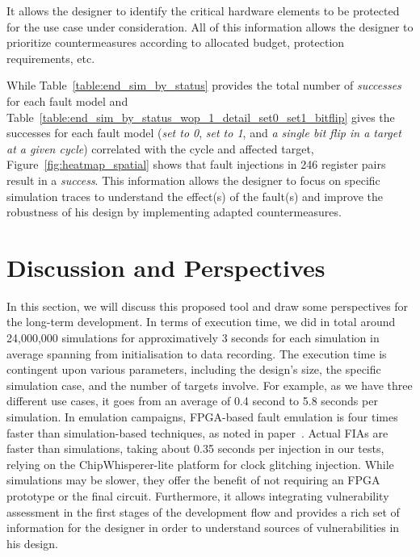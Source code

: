 It allows the designer to identify the critical hardware elements to be protected for the use case under consideration.
All of this information allows the designer to prioritize countermeasures according to allocated budget, protection requirements, etc.

While Table~\ref{table:end_sim_by_status} provides the total number of \textit{successes} for each fault model and Table~\ref{table:end_sim_by_status_wop_1_detail_set0_set1_bitflip} gives the successes for each fault model (\textit{set to 0}, \textit{set to 1}, and \textit{a single bit flip in a target at a given cycle}) correlated with the cycle and affected target, Figure~\ref{fig:heatmap_spatial} shows that fault injections in 246 register pairs result in a \textit{success}. This information allows the designer to focus on specific simulation traces to understand the effect(s) of the fault(s) and improve the robustness of his design by implementing adapted countermeasures.

\section{Discussion and Perspectives}

In this section, we will discuss this proposed tool and draw some perspectives for the long-term development.
In terms of execution time, we did in total around 24,000,000 simulations for approximatively 3 seconds for each simulation in average spanning from initialisation to data recording.
The execution time is contingent upon various parameters, including the design's size, the specific simulation case, and the number of targets involve. For example, as we have three different use cases, it goes from an average of 0.4 second to 5.8 seconds per simulation.
In emulation campaigns, FPGA-based fault emulation is four times faster than simulation-based techniques, as noted in paper~\cite{NNHRS-14-dsd}. Actual FIAs are faster than simulations, taking about 0.35 seconds per injection in our tests, relying on the ChipWhisperer-lite platform for clock glitching injection.
While simulations may be slower, they offer the benefit of not requiring an FPGA prototype or the final circuit. Furthermore, it allows integrating vulnerability assessment in the first stages of the development flow and provides a rich set of information for the designer in order to understand sources of vulnerabilities in his design.

